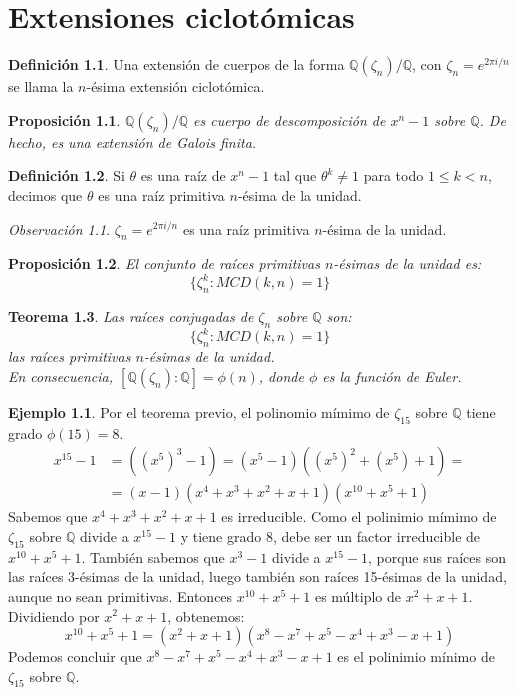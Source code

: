 \documentclass{report}
\newtheorem{theorem}{Teorema}[chapter]
\newtheorem{proposition}[theorem]{Proposición}
\theoremstyle{remark}
\newtheorem*{remark}{Observación}
\theoremstyle{definition}
\newtheorem{definition}{Definición}[chapter]
\theoremstyle{definition}
\theoremstyle{definition}
\newtheorem*{example}{Ejemplo}
\begin{document}
\chapter{Extensiones ciclotómicas}

\begin{definition}
    Una extensión de cuerpos de la forma $\mathbb{Q}(\zeta_n)/\mathbb{Q}$, con $\zeta_n = e^{2\pi i/n}$ se llama la $n$-ésima extensión ciclotómica.
\end{definition}

\begin{proposition}
    $\mathbb{Q}(\zeta_n)/\mathbb{Q}$ es cuerpo de descomposición de $x^n-1$ sobre $\mathbb{Q}$. De hecho, es una extensión de Galois finita.
\end{proposition}

\begin{definition}
    Si $\theta$ es una raíz de $x^n-1$ tal que $\theta^k \neq 1$ para todo $1 \leq k < n$, decimos que $\theta$ es una raíz primitiva $n$-ésima de la unidad.
\end{definition}

\begin{remark}
    $\zeta_n = e^{2\pi i/n}$ es una raíz primitiva $n$-ésima de la unidad.
\end{remark}

\begin{proposition}
    El conjunto de raíces primitivas $n$-ésimas de la unidad es:
    $$\{ \zeta^k_n : MCD(k, n) = 1 \}$$
\end{proposition}

\begin{theorem}
    Las raíces conjugadas de $\zeta_n$ sobre $\mathbb{Q}$ son:
    $$\{ \zeta^k_n : MCD(k, n) = 1 \}$$
    las raíces primitivas $n$-ésimas de la unidad.\\
    En consecuencia, $[\mathbb{Q}(\zeta_n) : \mathbb{Q}] = \phi(n)$, donde $\phi$ es la función de Euler.
\end{theorem}

\begin{example}
    Por el teorema previo, el polinomio mímimo de $\zeta_{15}$ sobre $\mathbb{Q}$ tiene grado $\phi(15) = 8$.
    \begin{align*}
        x^{15}-1 & = ((x^5)^3-1) = (x^5-1)((x^5)^2+(x^5)+1) = \\
                 & = (x-1)(x^4+x^3+x^2+x+1)(x^{10}+x^5+1)
    \end{align*}
    Sabemos que $x^4+x^3+x^2+x+1$ es irreducible.
    Como el polinimio mímimo de $\zeta_{15}$ sobre $\mathbb{Q}$ divide a $x^{15}-1$ y tiene grado 8, debe ser un factor irreducible de $x^{10}+x^5+1$.
    También sabemos que $x^3-1$ divide a $x^15-1$, porque sus raíces son las raíces 3-ésimas de la unidad, luego también son raíces 15-ésimas de la unidad, aunque no sean primitivas.
    Entonces $x^{10}+x^5+1$ es múltiplo de $x^2+x+1$. Dividiendo por $x^2+x+1$, obtenemos:
    $$x^{10}+x^5+1 = (x^2+x+1)(x^8-x^7+x^5-x^4+x^3-x+1)$$
    Podemos concluir que $x^8-x^7+x^5-x^4+x^3-x+1$ es el polinimio mínimo de $\zeta_{15}$ sobre $\mathbb{Q}$.
\end{example}
\end{document}
